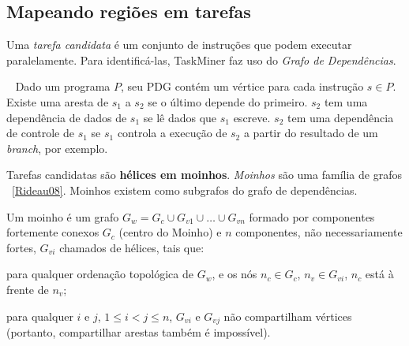 \documentclass[sigplan,10pt,review]{acmart}
\newcommand\Taskminer{\mbox{\textsf{TaskMiner}}}
\begin{document}
\subsection{Mapeando regiões em tarefas}
\label{sub:identification}

Uma {\em tarefa candidata} é um conjunto de instruções que podem executar paralelamente.
Para identificá-las, {\Taskminer} faz uso do {\em Grafo de Dependências}. 

\begin{definition} ~\cite{Ferrante87}
\label{def:pdg}
Dado um programa
$P$, seu PDG contém um vértice para cada instrução $s \in P$. Existe uma aresta de 
$s_1$ a $s_2$ se o último depende do primeiro. $s_2$ tem uma dependência de dados de $s_1$
se lê dados que $s_1$ escreve. $s_2$ tem uma dependência de controle de $s_1$ se $s_1$ controla
a execução de $s_2$ a partir do resultado de um \textit{branch}, por exemplo.
\end{definition}

Tarefas candidatas são \textbf{hélices em moinhos}. {\em Moinhos} são uma família de grafos ~\ref{Rideau08}.
Moinhos existem como subgrafos do grafo de dependências. 

\begin{definition} [Moinho]
\label{def:moinho}
Um moinho é um grafo $G_w = G_c \cup G_{v1} \cup \ldots \cup G_{vn}$
formado por componentes fortemente conexos $G_c$ (centro do Moinho) e $n$ componentes, não necessariamente
fortes, $G_{vi}$ chamados de hélices, tais que:
\begin{compactenum}
\item para qualquer ordenação topológica de $G_w$, e os nós $n_c \in G_c$,
$n_v \in G_{vi}$, $n_c$ está à frente de $n_v$;
\item para qualquer $i$ e $j$, $1 \leq i < j \leq n$, $G_{vi}$ e $G_{vj}$ não
compartilham vértices (portanto, compartilhar arestas também é impossível).
\end{compactenum}
\end{definition}
\end{document}
